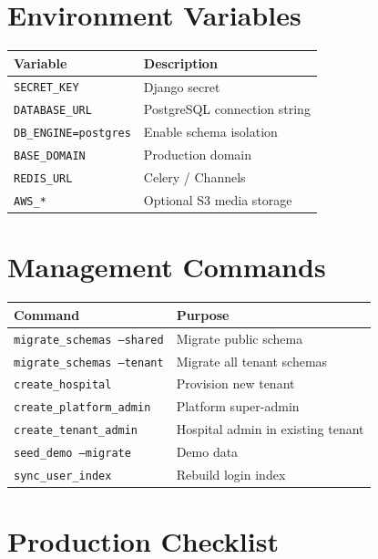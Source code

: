 \documentclass[11pt,a4paper]{report}
\begin{document}
\section{Environment Variables}

\begin{table}[h]
\centering
\small
\begin{tabular}{@{}ll@{}}
\toprule
\textbf{Variable} & \textbf{Description} \\
\midrule
\texttt{SECRET\_KEY} & Django secret \\
\texttt{DATABASE\_URL} & PostgreSQL connection string \\
\texttt{DB\_ENGINE=postgres} & Enable schema isolation \\
\texttt{BASE\_DOMAIN} & Production domain \\
\texttt{REDIS\_URL} & Celery / Channels \\
\texttt{AWS\_*} & Optional S3 media storage \\
\bottomrule
\end{tabular}
\end{table}

\section{Management Commands}

\begin{table}[h]
\centering
\small
\begin{tabular}{@{}ll@{}}
\toprule
\textbf{Command} & \textbf{Purpose} \\
\midrule
\texttt{migrate\_schemas --shared} & Migrate public schema \\
\texttt{migrate\_schemas --tenant} & Migrate all tenant schemas \\
\texttt{create\_hospital} & Provision new tenant \\
\texttt{create\_platform\_admin} & Platform super-admin \\
\texttt{create\_tenant\_admin} & Hospital admin in existing tenant \\
\texttt{seed\_demo --migrate} & Demo data \\
\texttt{sync\_user\_index} & Rebuild login index \\
\bottomrule
\end{tabular}
\end{table}

\section{Production Checklist}
\end{document}
